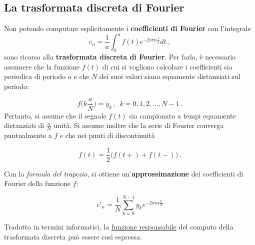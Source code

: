 \documentclass[
]{book}
\begin{document}
\hypertarget{dft}{%
\subsection{La trasformata discreta di Fourier}\label{dft}}

Non potendo computare esplicitamente i \textbf{coefficienti di Fourier} con l'integrale
\[ c_n=\frac{1}{a} \int_{0}^{a}f(t)e^{-2 i \pi n \textstyle \frac {t}{a}}dt \ , \]
sono ricorso alla \textbf{trasformata discreta di Fourier}.
Per farlo, è necessario assumere che la funzione \(f(t)\) di cui si vogliono calcolare i coefficienti sia periodica di periodo \(a\) e che \(N\) dei suoi valori siano equamente distanziati sul periodo:

\[f \bigg( k\frac{a}{N} \bigg)=y_{k} \ , \ \ k=0,1,2,..., N-1 \ .\]
Pertanto, si assume che il segnale \(f(t)\) sia campionato a tempi equamente distanziati di \(\frac{a}{N}\) unità.
Si assume inoltre che la serie di Fourier converga puntualmente a \(f\) e che nei punti di discontinuità

\[f(t)=\frac{1}{2}\big(f(t+)+f(t-)\big) \ .\]

Con la \emph{formula del trapezio}, si ottiene un'\textbf{approssimazione} dei coefficienti di Fourier della funzione \(f\):

\begin{equation}
    c'_n=\frac{1}{N}\sum_{k=0}^{N-1}y_{k}e^{-2\pi in\frac{k}{N}}
    \label{eq:dcoeff}
\end{equation}

Tradotto in termini informatici, la \href{}{funzione responsabile} del computo della trasformata discreta può essere così espressa:
\end{document}
